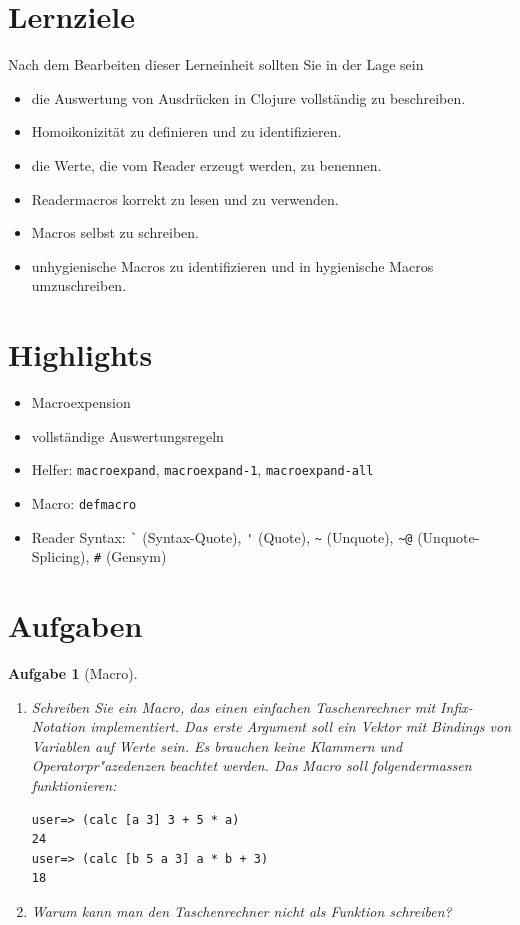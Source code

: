 \documentclass[11pt,a4paper]{article}
\newcounter{numb}
\theoremstyle{break}
\newtheorem{aufgabe}{Aufgabe}[numb]
\begin{document}
\section{Lernziele}

Nach dem Bearbeiten dieser Lerneinheit sollten Sie in der Lage sein

\begin{itemize}
    \item die Auswertung von Ausdr\"ucken in Clojure vollst\"andig zu beschreiben.
    \item Homoikonizit\"at zu definieren und zu identifizieren.
    \item die Werte, die vom Reader erzeugt werden, zu benennen.
    \item Readermacros korrekt zu lesen und zu verwenden.
    \item Macros selbst zu schreiben.
    \item unhygienische Macros zu identifizieren und in hygienische Macros umzuschreiben.
\end{itemize}

\section{Highlights}

\begin{itemize}
    \item Macroexpension
    \item vollst\"andige Auswertungsregeln
    \item Helfer: \verb|macroexpand|, \verb|macroexpand-1|, \verb|macroexpand-all|
    \item Macro: \verb|defmacro|
    \item Reader Syntax: \verb|`| (Syntax-Quote), \verb|'| (Quote), \verb|~| (Unquote), \verb|~@| (Unquote-Splicing), \verb|#| (Gensym)
\end{itemize}



\section{Aufgaben}

\begin{aufgabe}[Macro]
\begin{enumerate}[label=\alph*)]
\item
Schreiben Sie ein Macro, das einen einfachen Taschenrechner mit Infix-Notation implementiert. Das erste Argument soll ein Vektor mit Bindings von Variablen auf Werte sein. Es brauchen keine Klammern und Operatorpr"azedenzen beachtet werden. Das Macro soll folgendermassen funktionieren:
\begin{verbatim}
user=> (calc [a 3] 3 + 5 * a)
24
user=> (calc [b 5 a 3] a * b + 3)
18
\end{verbatim}
\item Warum kann man den Taschenrechner nicht als Funktion schreiben?
\end{enumerate}
\end{aufgabe}
\end{document}

